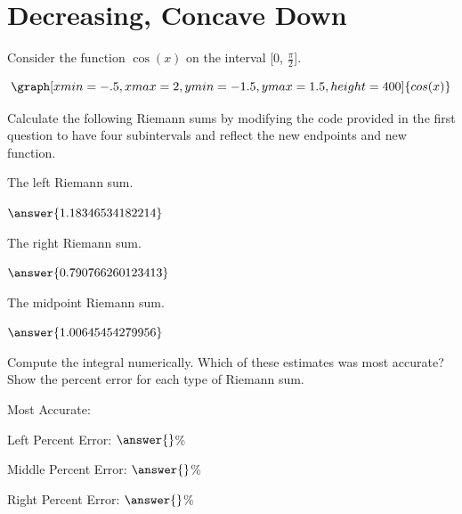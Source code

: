 \documentclass{ximera}
\begin{document}
\section{Decreasing, Concave Down}
\begin{question}
Consider the function $\cos(x)$ on the interval [0, $\frac{\pi}{2}$].

\[
\graph[xmin=-.5,xmax=2,ymin=-1.5,ymax=1.5,height=400]{cos(x)}
\]

Calculate the following Riemann sums by modifying the code provided in the first question to have four subintervals and reflect the new endpoints and new function.

The left Riemann sum.

\begin{onlineOnly}
\begin{sageCell}

\end{sageCell}
\end{onlineOnly}

$\answer{1.18346534182214}$

The right Riemann sum.

\begin{onlineOnly}
\begin{sageCell}

\end{sageCell}
\end{onlineOnly}

$\answer{0.790766260123413}$

The midpoint Riemann sum.

\begin{onlineOnly}
\begin{sageCell}

\end{sageCell}
\end{onlineOnly}

$\answer{1.00645454279956}$

Compute the integral numerically. Which of these estimates was most accurate? Show the percent error for each type of Riemann sum.

\begin{onlineOnly}
\begin{sageCell}

\end{sageCell}
\end{onlineOnly}

Most Accurate:
\begin{multipleChoice}
\end{multipleChoice}
Left Percent Error: $\answer{}$\%

Middle Percent Error: $\answer{}$\%

Right Percent Error: $\answer{}$\%
\end{question}
\end{document}
